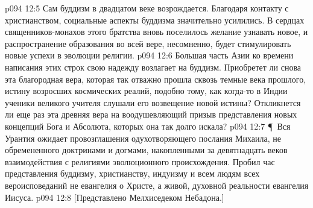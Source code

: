 \vs p094 12:5 Сам буддизм в двадцатом веке возрождается. Благодаря контакту с христианством, социальные аспекты буддизма значительно усилились. В сердцах священников\hyp{}монахов этого братства вновь поселилось желание узнавать новое, и распространение образования во всей вере, несомненно, будет стимулировать новые успехи в эволюции религии.
\vs p094 12:6 Большая часть Азии ко времени написания этих строк свою надежду возлагает на буддизм. Приобретет ли снова эта благородная вера, которая так отважно прошла сквозь темные века прошлого, истину возросших космических реалий, подобно тому, как когда\hyp{}то в Индии ученики великого учителя слушали его возвещение новой истины? Откликнется ли еще раз эта древняя вера на воодушевляющий призыв представления новых концепций Бога и Абсолюта, которых она так долго искала?
\vs p094 12:7 \P\ Вся Урантия ожидает провозглашения одухотворяющего послания Михаила, не обремененного доктринами и догмами, накопленными за девятнадцать веков взаимодействия с религиями эволюционного происхождения. Пробил час представления буддизму, христианству, индуизму и всем людям всех вероисповеданий не евангелия о Христе, а живой, духовной реальности евангелия Иисуса.
\vs p094 12:8 [Представлено Мелхиседеком Небадона.]
